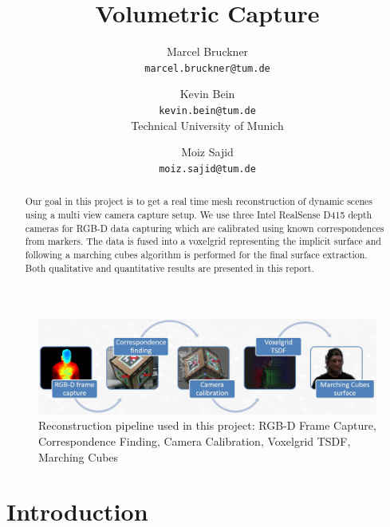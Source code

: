 \documentclass[10pt,twocolumn,letterpaper]{article}
\begin{document}
\title{Volumetric Capture}

\author{Marcel Bruckner\\
{\tt\small marcel.bruckner@tum.de}
\and
Kevin Bein\\
{\tt\small kevin.bein@tum.de}\\[0.5em]
Technical University of Munich
\and
Moiz Sajid\\
{\tt\small moiz.sajid@tum.de}
}

\maketitle

\newcommand{\fref}[1]{\mbox{Figure~\ref{#1}}}

\begin{abstract}
   Our goal in this project is to get a real time mesh reconstruction of dynamic scenes using a multi view camera capture setup. We use three Intel RealSense D415 depth cameras for RGB-D data capturing which are calibrated using known correspondences from markers. The data is fused into a voxelgrid representing the implicit surface and following a marching cubes algorithm is performed for the final surface extraction. Both qualitative and quantitative results are presented in this report.   
\end{abstract}


\begin{figure}[t]
	\begin{center}
		\includegraphics[width=1.0\linewidth]{imgs/pipeline}
	\end{center}
	\caption{Reconstruction pipeline used in this project: RGB-D Frame Capture, Correspondence Finding, Camera Calibration, Voxelgrid TSDF, Marching Cubes}
	\label{fig:reconstruction-pipeline}
\end{figure}

\section{Introduction}
\end{document}

